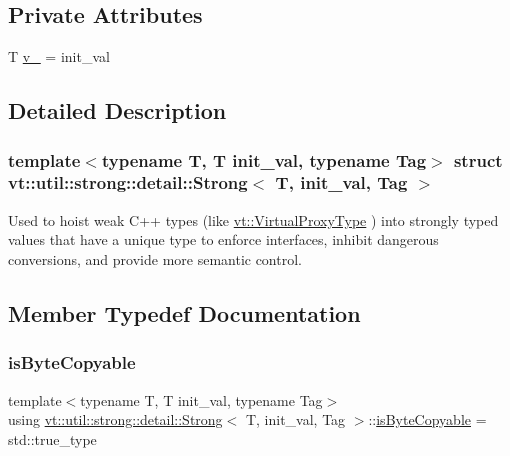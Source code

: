 \subsection*{Private Attributes}
\begin{DoxyCompactItemize}
\item 
T \hyperlink{structvt_1_1util_1_1strong_1_1detail_1_1_strong_a33b2c6727665a7c34405125870e71895}{v\+\_\+} = init\+\_\+val
\end{DoxyCompactItemize}


\subsection{Detailed Description}
\subsubsection*{template$<$typename T, T init\+\_\+val, typename Tag$>$\newline
struct vt\+::util\+::strong\+::detail\+::\+Strong$<$ T, init\+\_\+val, Tag $>$}

Used to hoist weak C++ types (like {\ttfamily \hyperlink{namespacevt_a1b417dd5d684f045bb58a0ede70045ac}{vt\+::\+Virtual\+Proxy\+Type}} ) into strongly typed values that have a unique type to enforce interfaces, inhibit dangerous conversions, and provide more semantic control. 



\subsection{Member Typedef Documentation}
\mbox{\label{structvt_1_1util_1_1strong_1_1detail_1_1_strong_add96444b837f77d0fc47ae3d29d00bdb}} 
\subsubsection{\texorpdfstring{is\+Byte\+Copyable}{isByteCopyable}}
{\footnotesize\ttfamily template$<$typename T, T init\+\_\+val, typename Tag$>$ \\
using \hyperlink{structvt_1_1util_1_1strong_1_1detail_1_1_strong}{vt\+::util\+::strong\+::detail\+::\+Strong}$<$ T, init\+\_\+val, Tag $>$\+::\hyperlink{structvt_1_1util_1_1strong_1_1detail_1_1_strong_add96444b837f77d0fc47ae3d29d00bdb}{is\+Byte\+Copyable} =  std\+::true\+\_\+type}

